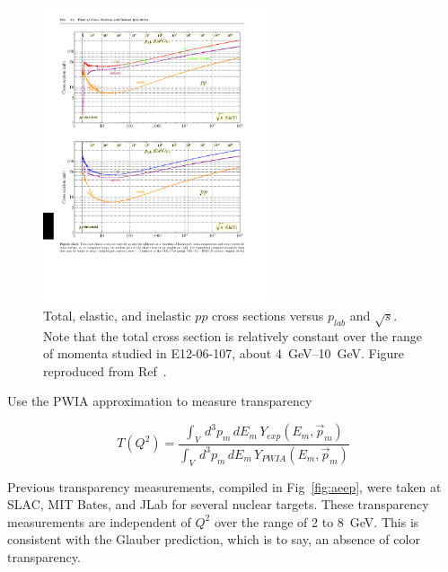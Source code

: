 \begin{figure}[!h]
    \centering
    \includegraphics[width=0.6\textwidth]{chap2/pdg_pp_cross_section.pdf}
    \caption[ Total, elastic, and inelastic $pp$ cross sections versus
             $p_{lab}$ and $\sqrt{s}$.]{
             Total, elastic, and inelastic $pp$ cross sections versus
             $p_{lab}$ and $\sqrt{s}$.
             Note that the total cross section is relatively constant over the
             range of momenta studied in E12-06-107, about
             \SIrange{4}{10}{\giga\electronvolt}.
             Figure reproduced from Ref~\cite{pdg_2020}.
            }
    \label{fig:pdg_pp_cross_section}
\end{figure}

Use the PWIA approximation to measure transparency

\begin{equation}
    T(Q^2) = \frac{\int_V \, d^3p_m \, dE_m \, Y_{exp}(E_m, \vec{p}_m)}
                  {\int_V \, d^3p_m \, dE_m \, Y_{PWIA}(E_m, \vec{p}_m)}
\end{equation}

Previous transparency measurements, compiled in Fig~\ref{fig:aeep}, were taken
at SLAC, MIT Bates, and JLab for several nuclear targets.
These transparency measurements are independent of $Q^2$ over the range of 2 to
\SI{8}{\giga\electronvolt}.
This is consistent with the Glauber prediction, which is to say, an absence of
color transparency.

